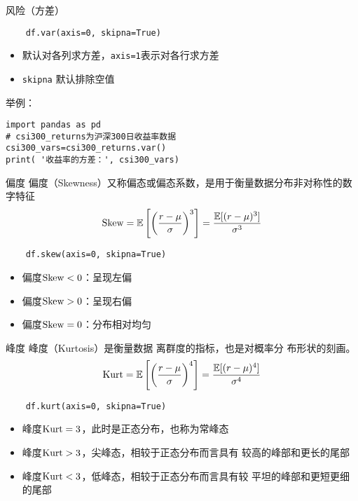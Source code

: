 \documentclass[t]{beamer}
\newcommand{\E}{\mathbb{E}}
\begin{document}
\begin{frame}[fragile]{风险（方差）}
\begin{lstlisting}
    df.var(axis=0, skipna=True)
\end{lstlisting}
\begin{itemize}
    \item 默认对各列求方差，\verb|axis=1|表示对各行求方差
    \item \verb|skipna| 默认排除空值
\end{itemize}
\begin{block}{举例：}
    \begin{lstlisting}
import pandas as pd
# csi300_returns为沪深300日收益率数据
csi300_vars=csi300_returns.var() 
print( '收益率的方差：', csi300_vars)
\end{lstlisting}
\end{block}
\end{frame}



\begin{frame}[fragile]{偏度}
    偏度（Skewness）又称偏态或偏态系数，是用于衡量数据分布非对称性的数字特征
\[{\rm Skew}=\E\left[\left(\frac{r-\mu}{\sigma}\right)^3\right]=\frac{\E[(r-\mu)^3]}{\sigma^3} \]
\begin{lstlisting}
    df.skew(axis=0, skipna=True)
\end{lstlisting}
\begin{itemize}
    \item 偏度${\rm Skew}<0$：呈现左偏
    \item 偏度${\rm Skew}>0$：呈现右偏
    \item 偏度${\rm Skew}=0$：分布相对均匀
\end{itemize}
\end{frame}


\begin{frame}[fragile]{峰度}
峰度（Kurtosis）是衡量数据
离群度的指标，也是对概率分
布形状的刻画。
\[{\rm Kurt}=\E\left[\left(\frac{r-\mu}{\sigma}\right)^4\right]=\frac{\E[(r-\mu)^4]}{\sigma^4} \]

\begin{lstlisting}
    df.kurt(axis=0, skipna=True)
\end{lstlisting}

\begin{itemize}
    \item 峰度${\rm Kurt}=3$，此时是正态分布，也称为常峰态
    \item 峰度${\rm Kurt}>3$，尖峰态，相较于正态分布而言具有
    较高的峰部和更长的尾部
    \item 峰度${\rm Kurt}<3$，低峰态，相较于正态分布而言具有较
    平坦的峰部和更短更细的尾部
\end{itemize}
\end{frame}
\end{document}
